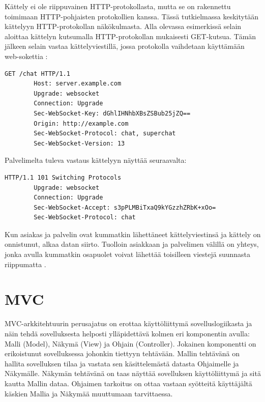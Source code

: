 \documentclass[utf8]{gradu3}
\begin{document}
Kättely ei ole riippuvainen HTTP-protokollasta, mutta se on rakennettu toimimaan HTTP-pohjaisten protokollien kanssa. Tässä tutkielmassa keskitytään kättelyyn HTTP-protokollan näkökulmasta. Alla olevassa esimerkissä selain aloittaa kättelyn kutsumalla HTTP-protokollan mukaisesti GET-kutsua. Tämän jälkeen selain vastaa kättelyviestillä, jossa protokolla vaihdetaan käyttämään web-sokettia \parencite[s. 1.1]{websocket}:

\begin{lstlisting}[language=Smalltalk]
        GET /chat HTTP/1.1
        Host: server.example.com
        Upgrade: websocket
        Connection: Upgrade
        Sec-WebSocket-Key: dGhlIHNhbXBsZSBub25jZQ==
        Origin: http://example.com
        Sec-WebSocket-Protocol: chat, superchat
        Sec-WebSocket-Version: 13
\end{lstlisting}

Palvelimelta tuleva vastaus kättelyyn näyttää seuraavalta:
\begin{lstlisting}[language=Smalltalk]
         HTTP/1.1 101 Switching Protocols
        Upgrade: websocket
        Connection: Upgrade
        Sec-WebSocket-Accept: s3pPLMBiTxaQ9kYGzzhZRbK+xOo=
        Sec-WebSocket-Protocol: chat
\end{lstlisting}

Kun asiakas ja palvelin ovat kummatkin lähettäneet kättelyviestinsä ja kättely on onnistunut, alkaa datan siirto. Tuolloin asiakkaan ja palvelimen välillä on yhteys, jonka avulla kummatkin osapuolet voivat lähettää toisilleen viestejä suunnasta riippumatta \parencite[s. 1.2]{websocket}. 


\chapter{MVC}
MVC-arkkitehtuurin perusajatus on erottaa käyttöliittymä sovelluslogiikasta ja
näin tehdä sovelluksesta helposti ylläpidettävä kolmen eri komponentin avulla:
Malli (Model), Näkymä (View) ja Ohjain (Controller). Jokainen komponentti on
erikoistunut sovelluksessa johonkin tiettyyn tehtävään. Mallin tehtävänä on
hallita sovelluksen tilaa ja vastata sen käsittelemästä datasta Ohjaimelle ja Näkymälle.
Näkymän tehtävänä on taas näyttää sovelluksen käyttöliittymä ja sitä kautta Mallin dataa. 
Ohjaimen tarkoitus on ottaa vastaan syötteitä käyttäjältä käskien Mallia ja Näkymää muuttumaan tarvittaessa.
\end{document}
